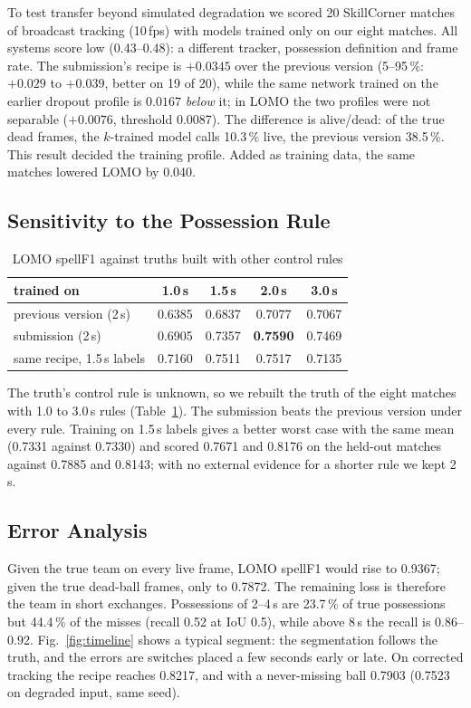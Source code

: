 \documentclass[conference]{IEEEtran}
\newcommand{\spf}{spellF1}
\newcommand{\lomo}{LOMO}
\begin{document}
To test transfer beyond simulated degradation we scored 20 SkillCorner matches of broadcast tracking (10\,fps) with
models trained only on our eight matches. All systems score low (0.43--0.48): a different tracker, possession
definition and frame rate. The submission's recipe is $+0.0345$ over the previous version (5--95\,\%: $+0.029$ to
$+0.039$, better on 19 of 20), while the same network trained on the earlier dropout profile is $0.0167$
\emph{below} it; in \lomo{} the two profiles were not separable ($+0.0076$, threshold 0.0087). The difference is
alive/dead: of the true dead frames, the $k$-trained model calls 10.3\,\% live, the previous version 38.5\,\%. This
result decided the training profile. Added as training data, the same matches lowered \lomo{} by 0.040.

\subsection{Sensitivity to the Possession Rule}
\label{sec:robust}

\begin{table}[t]
\caption{\lomo{} \spf{} against truths built with other control rules}
\label{tab:rule}
\centering
\footnotesize
\begin{tabular}{@{}lcccc@{}}
\toprule
trained on & 1.0\,s & 1.5\,s & 2.0\,s & 3.0\,s\\
\midrule
previous version (2\,s) & 0.6385 & 0.6837 & 0.7077 & 0.7067\\
submission (2\,s) & 0.6905 & 0.7357 & \textbf{0.7590} & 0.7469\\
same recipe, 1.5\,s labels & 0.7160 & 0.7511 & 0.7517 & 0.7135\\
\bottomrule
\end{tabular}
\end{table}

The truth's control rule is unknown, so we rebuilt the truth of the eight matches with 1.0 to 3.0\,s rules
(Table~\ref{tab:rule}). The submission beats the previous version under every rule. Training on 1.5\,s labels gives a
better worst case with the same mean (0.7331 against 0.7330) and scored 0.7671 and 0.8176 on the held-out matches
against 0.7885 and 0.8143; with no external evidence for a shorter rule we kept 2\,s.

\subsection{Error Analysis}

Given the true team on every live frame, \lomo{} \spf{} would rise to 0.9367; given the true dead-ball frames, only
to 0.7872. The remaining loss is therefore the team in short exchanges. Possessions of 2--4\,s are 23.7\,\% of true
possessions but 44.4\,\% of the misses (recall 0.52 at IoU 0.5), while above 8\,s the recall is 0.86--0.92.
Fig.~\ref{fig:timeline} shows a typical segment: the segmentation follows the truth, and the errors are switches
placed a few seconds early or late. On corrected tracking the recipe reaches 0.8217, and with a never-missing ball
0.7903 (0.7523 on degraded input, same seed).
\end{document}
